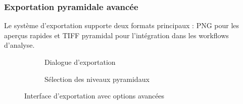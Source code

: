\documentclass[12pt,a4paper]{report}
\begin{document}
\subsubsection{Exportation pyramidale avancée}

Le système d'exportation supporte deux formats principaux : PNG pour les aperçus rapides et TIFF pyramidal pour l'intégration dans les workflows d'analyse.


\begin{figure}[H]
\centering
\begin{subfigure}{0.48\textwidth}
\caption{Dialogue d'exportation}
\end{subfigure}
\hfill
\begin{subfigure}{0.48\textwidth}
\caption{Sélection des niveaux pyramidaux}
\end{subfigure}
\caption{Interface d'exportation avec options avancées}
\label{fig:export_interface}
\end{figure}
\end{document}
